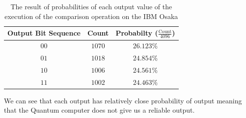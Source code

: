 \begin{table}[ht]
    \centering
    \begin{tabular}{c|c|c}
        Output Bit Sequence & Count & Probabilty ($\frac{\text{Count}}{4096}$) \\
        \hline
        $00$ & $1070$ & $26.123\%$ \\
        $01$ & $1018$ & $24.854\%$ \\
        $10$ & $1006$ & $24.561\%$ \\
        $11$ & $1002$ & $24.463\%$ \\
    \end{tabular}
    \caption{The result of probabilities of each output value of the execution of the comparison operation on the IBM Osaka}
\end{table}

We can see that each output has relatively close probability of output meaning that the Quantum computer does not give us a reliable output.